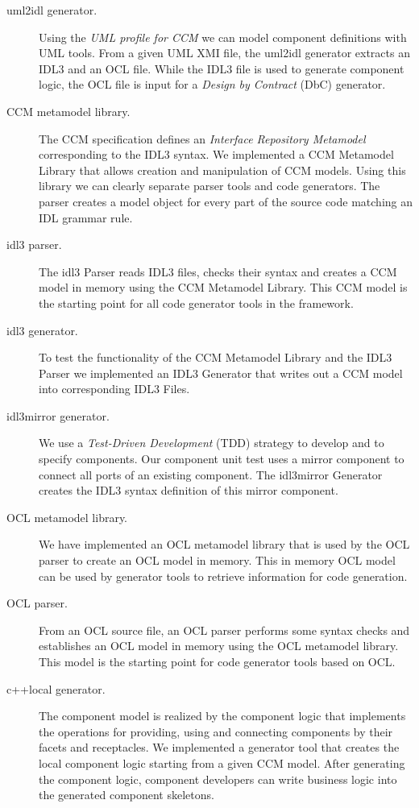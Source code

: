 \begin{description}
\item [uml2idl generator.]
Using the {\it UML profile for CCM} \cite{UML-CCM-Profile} we can model 
component definitions with UML tools. From a given UML XMI file, the uml2idl 
generator extracts an IDL3 and an OCL file. 
While the IDL3 file is used to generate component logic, the OCL file is input
for a {\it Design by Contract} (DbC) generator.

\item [CCM metamodel library.]
The CCM specification defines an {\it Interface Repository Metamodel} 
corresponding to the IDL3 syntax. We implemented a CCM Metamodel Library that 
allows creation and manipulation of CCM models. Using this library we can 
clearly separate parser tools and code generators. The parser creates a 
model object for every part of the source code matching an IDL grammar rule.

\item [idl3 parser.]
The idl3 Parser reads IDL3 files, checks their syntax 
and creates a CCM model in memory using the CCM Metamodel Library. This CCM
model is the starting point for all code generator tools in the framework.

\item [idl3 generator.]
To test the functionality of the CCM Metamodel Library and the IDL3 Parser we 
implemented an IDL3 Generator that writes out a CCM model into corresponding 
IDL3 Files.

\item [idl3mirror generator.]
We use a {\it Test-Driven Development} (TDD) strategy to develop and to specify
components. Our component unit test uses a
mirror component to connect all ports of an existing component. The idl3mirror
Generator creates the IDL3 syntax definition of this mirror component.


\item [OCL metamodel library.]
We have implemented an OCL metamodel library that is used by the OCL parser
to create an OCL model in memory.
This in memory OCL model can be used by generator tools to retrieve
information for code generation.

\item [OCL parser.]
From an OCL source file, an OCL parser performs some syntax checks and
establishes an OCL model in memory using the OCL metamodel library. 
This model is the starting point for code generator tools based on OCL. 

\item [c++local generator.]
The component model is realized by the component logic that implements the
operations for providing, using and connecting components by their facets and
receptacles. We implemented a generator tool that creates the local component
logic starting from a given CCM model. After generating the component logic, 
component developers can write business logic into the generated
component skeletons.


\end{description}
